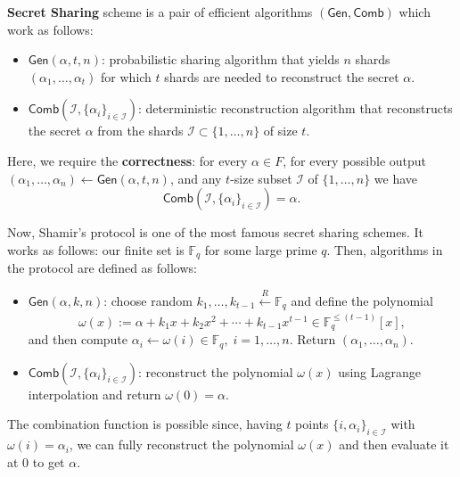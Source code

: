 \documentclass[../lecture-notes.tex]{subfiles}
\begin{document}
\begin{definition}
    \textbf{Secret Sharing} scheme is a pair of efficient algorithms $(\mathsf{Gen}, \mathsf{Comb})$ which work as follows:
    \begin{itemize}
        \item $\mathsf{Gen}(\alpha, t, n)$: probabilistic sharing algorithm that yields $n$ shards $(\alpha_1,\dots,\alpha_t)$ for which $t$ shards are needed to reconstruct the secret $\alpha$.
        \item $\mathsf{Comb}(\mathcal{I}, \{\alpha_i\}_{i \in \mathcal{I}})$: deterministic reconstruction algorithm that reconstructs the secret $\alpha$ from the shards $\mathcal{I} \subset \{1,\dots,n\}$ of size $t$.
    \end{itemize}

    Here, we require the \textbf{correctness}: for every $\alpha \in F$, for every possible output $(\alpha_1,\dots,\alpha_n) \gets \mathsf{Gen}(\alpha, t, n)$, and any $t$-size subset $\mathcal{I}$ of $\{1,\dots,n\}$ we have
    \begin{equation}
        \mathsf{Comb}(\mathcal{I}, \{\alpha_i\}_{i \in \mathcal{I}}) = \alpha.
    \end{equation}
\end{definition}

Now, Shamir's protocol is one of the most famous secret sharing schemes. It works as follows: our finite set is $\mathbb{F}_q$ for some large prime $q$. Then, algorithms in the protocol are defined as follows:
\begin{itemize}
    \item $\mathsf{Gen}(\alpha, k, n)$: choose random $k_1,\dots,k_{t-1} \xleftarrow[]{R} \mathbb{F}_q$ and define the polynomial
    \begin{equation}
        \omega(x) := \alpha + k_1x + k_2x^2 + \cdots + k_{t-1}x^{t-1} \in \mathbb{F}_q^{\leq (t-1)}[x],     
    \end{equation}
    and then compute $\alpha_i \gets \omega(i) \in \mathbb{F}_q, \; i = 1,\dots,n$. Return $(\alpha_1,\dots,\alpha_n)$.
    \item $\mathsf{Comb}(\mathcal{I}, \{\alpha_i\}_{i \in \mathcal{I}})$: reconstruct the polynomial $\omega(x)$ using Lagrange interpolation and return $\omega(0) = \alpha$.
\end{itemize}

The combination function is possible since, having $t$ points $\{i,\alpha_i\}_{i \in \mathcal{I}}$ with $\omega(i) = \alpha_i$, we can fully reconstruct the polynomial $\omega(x)$ and then evaluate it at $0$ to get $\alpha$.
\end{document}
